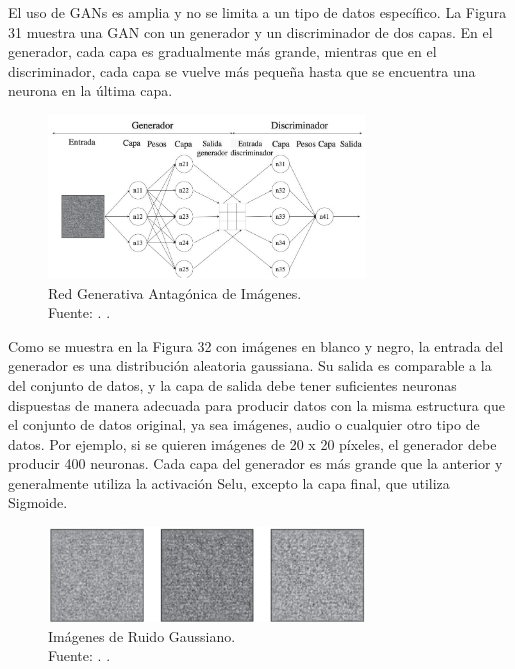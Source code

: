 El uso de GANs es amplia y no se limita a un tipo de datos específico. La Figura 31 muestra una GAN con un generador y un discriminador de dos capas. En el generador, cada capa es gradualmente más grande, mientras que en el discriminador, cada capa se vuelve más pequeña hasta que se encuentra una neurona en la última capa. \parencite{tec_goodfellow2014gan}

\begin{figure}[!ht]
	\begin{center}
		\includegraphics[width=0.75\textwidth]{2/figures/redgan2.jpg}
		\caption[Red Generativa Antagónica de Imágenes]{Red Generativa Antagónica de Imágenes.\\
		Fuente: \cite{tec_goodfellow2014gan}. .}
		\label{2:fig48}
	\end{center}
\end{figure}

Como se muestra en la Figura 32 con imágenes en blanco y negro, la entrada del generador es una distribución aleatoria gaussiana. Su salida es comparable a la del conjunto de datos, y la capa de salida debe tener suficientes neuronas dispuestas de manera adecuada para producir datos con la misma estructura que el conjunto de datos original, ya sea imágenes, audio o cualquier otro tipo de datos. Por ejemplo, si se quieren imágenes de 20 x 20 píxeles, el generador debe producir 400 neuronas. Cada capa del generador es más grande que la anterior y generalmente utiliza la activación Selu, excepto la capa final, que utiliza Sigmoide. \parencite{tec_goodfellow2014gan}

\begin{figure}[!ht]
	\begin{center}
		\includegraphics[width=0.75\textwidth]{2/figures/redgan3.jpg}
		\caption[Imágenes de Ruido Gaussiano]{Imágenes de Ruido Gaussiano.\\
		Fuente: \cite{tec_goodfellow2014gan}. .}
		\label{2:fig49}
	\end{center}
\end{figure}

